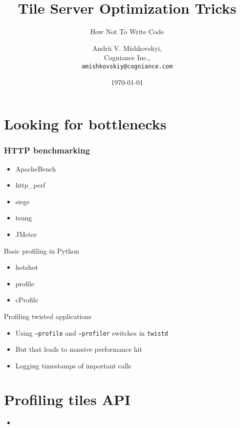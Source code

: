 \documentclass[16pt]{beamer}
\title{Tile Server Optimization Tricks}
\subtitle{How Not To Write Code}
\author{Andrii V. Mishkovskyi,\\
  Cogniance Inc.,\\
  \texttt{amishkovskiy@cogniance.com}}
\date{\today}
\begin{document}
\begin{frame}
  \titlepage
\end{frame}

\begin{frame}
  \tableofcontents
\end{frame}

\section{Looking for bottlenecks}

\begin{frame}
  \frametitle{HTTP benchmarking}
  \begin{itemize}
  \item ApacheBench
  \item http\_perf
  \item siege
  \item tsung
  \item JMeter
  \end{itemize}
\end{frame}

\begin{frame}{Basic profiling in Python}
  \begin{itemize}
  \item hotshot
  \item profile
  \item cProfile
  \end{itemize}
\end{frame}

\begin{frame}{Profiling twisted applications}
  \begin{itemize}
  \item Using \texttt{--profile} and \texttt{--profiler}
    switches in \texttt{twistd}
  \item But that leads to massive performance hit
  \item Logging timestamps of important calls
  \end{itemize}
\end{frame}

\section{Profiling tiles API}

\begin{frame}{}
  \begin{itemize}
  \item
  \end{itemize}
\end{frame}
\end{document}
